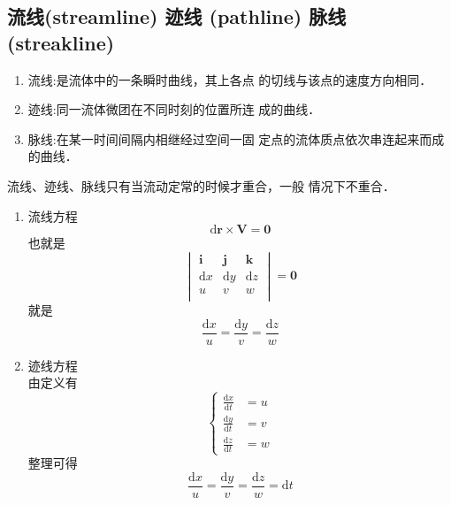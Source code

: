\subsection{流线(streamline) \hspace{1em} 迹线
	(pathline)\hspace{1em} 脉线(streakline)}
\begin{enumerate}
	\item 流线:是流体中的一条瞬时曲线，其上各点
	      的切线与该点的速度方向相同．
	\item 迹线:同一流体微团在不同时刻的位置所连
	      成的曲线．
	\item 脉线:在某一时间间隔内相继经过空间一固
	      定点的流体质点依次串连起来而成的曲线．
\end{enumerate}
\begin{note}
	流线、迹线、脉线只有当流动定常的时候才重合，一般
	情况下不重合．
\end{note}
\begin{enumerate}
	\item 流线方程\\
	      \[
		      \mathrm{d}\mathbf{r}\times \mathbf{V}=\mathbf{0}
	      \]
	      也就是
	      \begin{equation*}
		      \begin{vmatrix}
			      \mathbf{i}  & \mathbf{j}  & \mathbf{k}  \\
			      \mathrm{d}x & \mathrm{d}y & \mathrm{d}z \\
			      u           & v           & w           \\
		      \end{vmatrix}=\mathbf{0}
	      \end{equation*}
	      就是
	      \[
		      \frac{\mathrm{d}x}{u}=\frac{\mathrm{d}y}{v }=
		      \frac{\mathrm{d}z}{w}
	      \]
	\item 迹线方程 \\
	      由定义有
	      \begin{equation*}
		      \begin{cases}
			      \frac{\mathrm{d}x}{\mathrm{d}t } & =u \\
			      \frac{\mathrm{d}y}{\mathrm{d}t } & =v \\
			      \frac{\mathrm{d}z}{\mathrm{d}t } & =w
		      \end{cases}
	      \end{equation*}
	      整理可得
	      \[
		      \frac{\mathrm{d}x}{u}=\frac{\mathrm{d}y}{v }=
		      \frac{\mathrm{d}z}{w}=\mathrm{d} t
	      \]
\end{enumerate}

